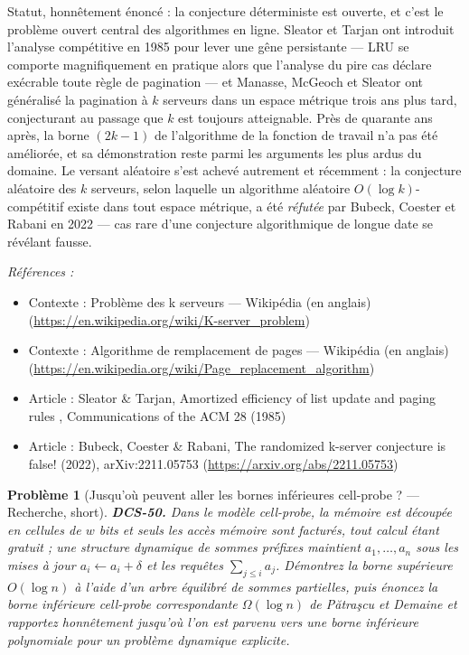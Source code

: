 \documentclass[11pt]{article}
\newtheorem{problem}{Problème}
\newenvironment{refs}{\par\small\noindent\emph{Références :}\begin{itemize}\setlength\itemsep{0pt}}{\end{itemize}\normalsize}
\begin{document}
\noindent Statut, honnêtement énoncé : la conjecture déterministe est ouverte, et c'est le problème ouvert central des algorithmes en ligne. Sleator et Tarjan ont introduit l'analyse compétitive en 1985 pour lever une gêne persistante --- LRU se comporte magnifiquement en pratique alors que l'analyse du pire cas déclare exécrable toute règle de pagination --- et Manasse, McGeoch et Sleator ont généralisé la pagination à $ k $ serveurs dans un espace métrique trois ans plus tard, conjecturant au passage que $ k $ est toujours atteignable. Près de quarante ans après, la borne $ (2k-1) $ de l'algorithme de la fonction de travail n'a pas été améliorée, et sa démonstration reste parmi les arguments les plus ardus du domaine. Le versant aléatoire s'est achevé autrement et récemment : la conjecture aléatoire des $ k $ serveurs, selon laquelle un algorithme aléatoire $ O(\log k) $-compétitif existe dans tout espace métrique, a été \textit{réfutée} par Bubeck, Coester et Rabani en 2022 --- cas rare d'une conjecture algorithmique de longue date se révélant fausse.

\begin{refs}
\item Contexte : Problème des k serveurs --- Wikipédia (en anglais) (\url{https://en.wikipedia.org/wiki/K-server_problem})
\item Contexte : Algorithme de remplacement de pages --- Wikipédia (en anglais) (\url{https://en.wikipedia.org/wiki/Page_replacement_algorithm})
\item Article : Sleator \& Tarjan, \og{} Amortized efficiency of list update and paging rules \fg{}, Communications of the ACM 28 (1985)
\item Article : Bubeck, Coester \& Rabani, \og{} The randomized k-server conjecture is false! \fg{} (2022), arXiv:2211.05753 (\url{https://arxiv.org/abs/2211.05753})
\end{refs}

\bigskip

\begin{problem}[{Jusqu'où peuvent aller les bornes inférieures cell-probe ? --- Recherche, short}]
\textbf{DCS-50.} Dans le modèle cell-probe, la mémoire est découpée en cellules de $ w $ bits et seuls les accès mémoire sont facturés, tout calcul étant gratuit ; une structure dynamique de sommes préfixes maintient $ a_1, \dots, a_n $ sous les mises à jour $ a_i \gets a_i + \delta $ et les requêtes $ \sum_{j \le i} a_j $. Démontrez la borne supérieure $ O(\log n) $ à l'aide d'un arbre équilibré de sommes partielles, puis énoncez la borne inférieure cell-probe correspondante $ \Omega(\log n) $ de P\u{a}tra\c{s}cu et Demaine et rapportez honnêtement jusqu'où l'on est parvenu vers une borne inférieure polynomiale pour un problème dynamique explicite.
\end{problem}
\end{document}
